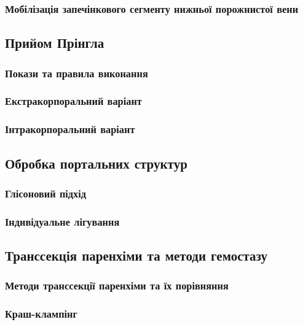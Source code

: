 \begin{refsection}
\subsubsection{Мобілізація запечінкового сегменту нижньої порожнистої вени}

\subsection{Прийом Прінгла}

\subsubsection{Покази та правила виконання}

\subsubsection{Екстракорпоральний варіант}

\subsubsection{Інтракорпоральний варіант}

\subsection{Обробка портальних структур}

\subsubsection{Глісоновий підхід}

\subsubsection{Індивідуальне лігування}

\subsection{Транссекція паренхіми та методи гемостазу}

\subsubsection{Методи транссекції паренхіми та їх порівняння}

\subsubsection{Краш-клампінг}


\end{refsection}
